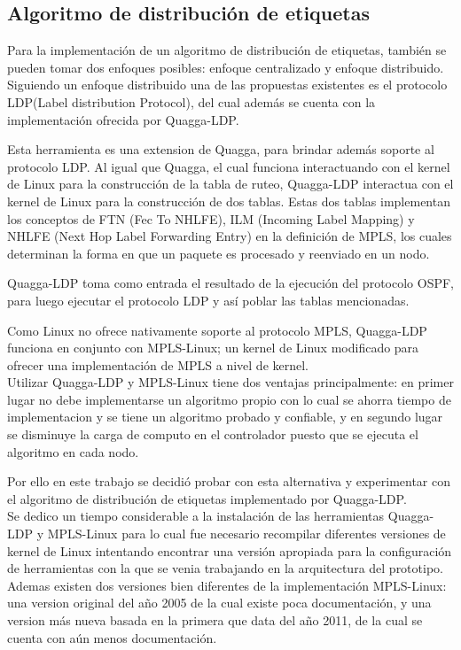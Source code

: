 \subsection{Algoritmo de distribución de etiquetas}

Para la implementaci\'on de un algoritmo de distribución de etiquetas, también se pueden tomar dos enfoques posibles: enfoque centralizado y enfoque distribuido.\\

Siguiendo un enfoque distribuido una de las propuestas existentes es el protocolo LDP(Label distribution Protocol), del cual adem\'as se cuenta con la implementaci\'on ofrecida por Quagga-LDP. 

Esta herramienta es una extension de Quagga, para brindar adem\'as soporte al protocolo LDP. Al igual que Quagga, el cual funciona interactuando con el kernel de Linux para la construcci\'on de la tabla de ruteo, Quagga-LDP interactua con el kernel de Linux para la construcci\'on de dos tablas. Estas dos tablas implementan los conceptos de FTN (Fec To NHLFE), ILM (Incoming Label Mapping) y NHLFE (Next Hop Label Forwarding Entry) en la definición de MPLS, los cuales determinan la forma en que un paquete es procesado y reenviado en un nodo.

Quagga-LDP toma como entrada el resultado de la ejecuci\'on del protocolo OSPF, para luego ejecutar el protocolo LDP y así poblar las tablas mencionadas.

Como Linux no ofrece nativamente soporte al protocolo MPLS, Quagga-LDP funciona en conjunto con MPLS-Linux; un kernel de Linux modificado para ofrecer una implementaci\'on de MPLS a nivel de kernel.\\

Utilizar Quagga-LDP y MPLS-Linux tiene dos ventajas principalmente: en primer lugar no debe implementarse un algoritmo propio con lo cual se ahorra tiempo de implementacion y se tiene un algoritmo probado y confiable, y en segundo lugar se disminuye la carga de computo en el controlador puesto que se ejecuta el algoritmo en cada nodo.

Por ello en este trabajo se decidió probar con esta alternativa y experimentar con el algoritmo de distribución de etiquetas implementado por Quagga-LDP.\\

Se dedico un tiempo considerable a la instalaci\'on de las herramientas Quagga-LDP y MPLS-Linux para lo cual fue necesario recompilar diferentes versiones de kernel de Linux intentando encontrar una versi\'on apropiada para la configuración de herramientas con la que se venia trabajando en la arquitectura del prototipo. Ademas existen dos versiones bien diferentes de la implementaci\'on MPLS-Linux: una version original del año 2005 de la cual existe poca documentación, y una version m\'as nueva basada en la primera que data del año 2011, de la cual se cuenta con a\'un menos documentación. 

